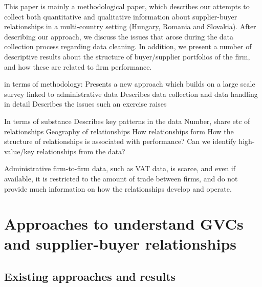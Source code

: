 \documentclass[final, dvipsnames, authoryear,12pt]{elsarticle}
\begin{document}
This paper is mainly a methodological paper, which describes our attempts to collect both quantitative and qualitative information about supplier-buyer relationships in a multi-country setting (Hungary, Romania and Slovakia). After describing our approach, we discuss the issues that arose during the data collection process regarding data cleaning. In addition, we present a number of descriptive results about the structure of buyer/supplier portfolios of the firm, and how these are related to firm performance.

in terms of methodology: 
Presents a new approach which builds on a large scale survey linked to administrative data
Describes data collection and data handling in detail
Describes the issues such an exercise raises

In terms of substance
Describes key patterns in the data
Number, share etc of relationships
Geography of relationships
How relationships form
How the structure of relationships is associated with performance?
Can we identify high-value/key relationships from the data?



Administrative firm-to-firm data, such as VAT data, is scarce, and even if available, it is restricted to the amount of trade between firms, and do not provide much information on how the relationships develop and operate.

\section{Approaches to understand GVCs and supplier-buyer relationships} 
\label{sec: approach}

\subsection{Existing approaches and results}
\end{document}
